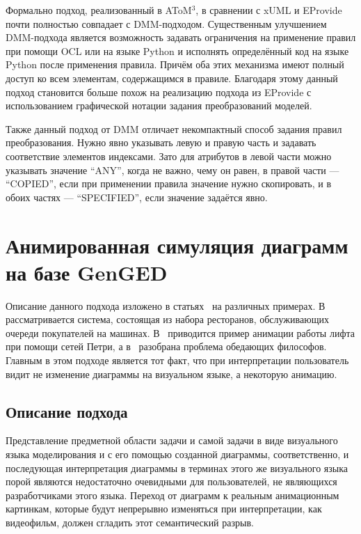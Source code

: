 \documentclass[a5paper]{article}
\begin{document}
Формально подход, реализованный в AToM$^3$, в сравнении с xUML и EProvide почти полностью совпадает с DMM-подходом. Существенным улучшением DMM-подхода является возможность задавать ограничения на применение правил при помощи OCL или на языке Python и исполнять определённый код на языке Python после применения правила. Причём оба этих механизма имеют полный доступ ко всем элементам, содержащимся в правиле. Благодаря этому данный подход становится больше похож на реализацию подхода из EProvide с использованием графической нотации задания преобразований моделей.

Также данный подход от DMM отличает некомпактный способ задания правил преобразования. Нужно явно указывать левую и правую часть и задавать соответствие элементов индексами. Зато для атрибутов в левой части можно указывать значение “ANY”, когда не важно, чему он равен, в правой части --- “COPIED”, если при применении правила значение нужно скопировать, и в обоих частях --- “SPECIFIED”, если значение задаётся явно.

\section{Анимированная симуляция диаграмм на базе GenGED}

Описание данного подхода изложено в статьях~\cite{genged1, genged2, genged3} на различных примерах. В~\cite{genged3} рассматривается система, состоящая из набора ресторанов, обслуживающих очереди покупателей на машинах. В~\cite{genged1} приводится пример анимации работы лифта при помощи сетей Петри, а в~\cite{genged2} разобрана проблема обедающих философов. Главным в этом подходе является тот факт, что при интерпретации пользователь видит не изменение диаграммы на визуальном языке, а некоторую анимацию.

\subsection{Описание подхода}

Представление предметной области задачи и самой задачи в виде визуального языка моделирования и с его помощью созданной диаграммы, соответственно, и последующая интерпретация диаграммы в терминах этого же визуального языка порой являются недостаточно очевидными для пользователей, не являющихся разработчиками этого языка. Переход от диаграмм к реальным анимационным картинкам, которые будут непрерывно изменяться при интерпретации, как видеофильм, должен сгладить этот семантический разрыв.
\end{document}
